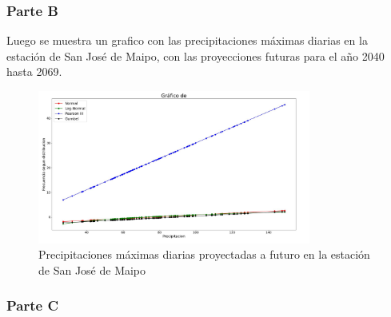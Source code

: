 \documentclass{article}  %
\begin{document}
\newpage
\subsubsection{Parte B}

Luego se muestra un grafico con las precipitaciones máximas diarias en la estación de San José de Maipo, con las proyecciones futuras para el año 2040 hasta 2069.

\begin{figure}[H]
    \centering
    \includegraphics[width=0.8\textwidth]{grafico_b.jpg}
    \caption{Precipitaciones máximas diarias proyectadas a futuro en la estación de San José de Maipo}
    \label{fig:precipitaciones_maximas_diarias}
\end{figure}


\subsubsection{Parte C}
\end{document}
